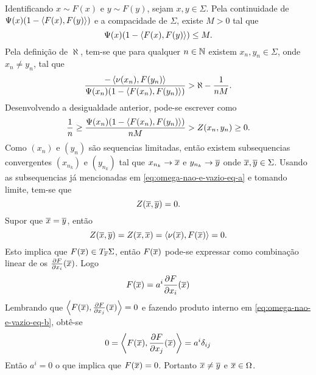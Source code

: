 \begin{demonstracao}
	Identificando $x \sim F(x)$ e $y \sim F(y)$, sejam $x,y \in \Sigma$. Pela continuidade de
	$\Psi(x) (1 - \left\langle F(x),F(y) \right\rangle)$ e 
	a compacidade de $\Sigma$,
	existe $M > 0$ tal que
	\begin{equation*}
	\Psi(x) (1 - \left\langle F(x),F(y) \right\rangle) \leq M.
	\end{equation*}
	Pela definição de $\aleph$, tem-se
	que para qualquer $n \in \mathbb{N}$ existem $x_n,y_n \in \Sigma$, onde $x_n \neq y_n$, tal que
	\begin{equation*}
	\frac{- \left\langle \nu(x_n),F(y_n) \right\rangle}{\Psi(x_n) (1 - \left\langle F(x_n),F(y_n) \right\rangle)} > \aleph - \frac{1}{nM}.
	\end{equation*}
	Desenvolvendo a desigualdade anterior, pode-se escrever como
	\begin{equation}\label{eq:omega-nao-e-vazio-eq-a}
	\frac{1}{n} \geq \frac{\Psi(x_n) (1 - \left\langle F(x_n),F(y_n) \right\rangle)}{nM} > Z(x_n,y_n) \geq 0.
	\end{equation}
	Como $(x_n)$ e $(y_n)$ são sequencias limitadas, então existem subsequencias convergentes $(x_{n_k})$ e $(y_{n_k})$ tal que
	$x_{n_k} \rightarrow \overline{x}$ e
	$y_{n_k} \rightarrow \overline{y}$
	onde $\overline{x}, \overline{y} \in \Sigma$.
	Usando as subsequencias já mencionadas em \eqref{eq:omega-nao-e-vazio-eq-a} e tomando limite, tem-se que
	\begin{equation*}
	Z(\overline{x},\overline{y}) = 0.
	\end{equation*}
	Supor que $\overline{x} = \overline{y}$, então
	\begin{equation*}
	Z(\overline{x},\overline{y}) = Z(\overline{x}, \overline{x}) = \left\langle \nu(\overline{x}),F(\overline{x}) \right\rangle = 0.
	\end{equation*}
	Esto implica que 
	$F(\overline{x}) \in T_{\overline{x}} \Sigma$,
	então $F(\overline{x})$ pode-se expressar como combinação linear de os $\frac{\partial F}{\partial x_i}(\overline{x})$. Logo
	\begin{equation}\label{eq:omega-nao-e-vazio-eq-b}
	F(\overline{x}) = a^i \frac{\partial F}{\partial x_i}(\overline{x})
	\end{equation}
	Lembrando que
	$\left\langle F(\overline{x}),\frac{\partial F}{\partial x_j}(\overline{x}) \right\rangle = 0$
	e fazendo produto interno em \eqref{eq:omega-nao-e-vazio-eq-b}, obtê-se
	\begin{equation*}
	0 = \left\langle F(\overline{x}),\frac{\partial F}{\partial x_j}(\overline{x}) \right\rangle = a^i \delta_{ij}
	\end{equation*}
	Então
	$a^i = 0$
	o que implica que
	$F(\overline{x}) = 0$.
	Portanto
	$\overline{x} \neq \overline{y}$ e
	$\overline{x} \in \Omega$.
\end{demonstracao}

